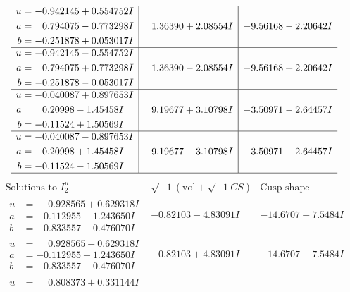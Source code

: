 \documentclass[1p]{elsarticle_modified}
\theoremstyle{definition}
\newcommand{\I}{\sqrt{-1}}
\begin{document}
$$\begin{array}{c|c|c}
\begin{aligned}
u &= -0.942145 + 0.554752 I \\
a &= \phantom{-}0.794075 - 0.773298 I \\
b &= -0.251878 + 0.053017 I\end{aligned}
 & \phantom{-}1.36390 + 2.08554 I & -9.56168 - 2.20642 I \\ \hline\begin{aligned}
u &= -0.942145 - 0.554752 I \\
a &= \phantom{-}0.794075 + 0.773298 I \\
b &= -0.251878 - 0.053017 I\end{aligned}
 & \phantom{-}1.36390 - 2.08554 I & -9.56168 + 2.20642 I \\ \hline\begin{aligned}
u &= -0.040087 + 0.897653 I \\
a &= \phantom{-}0.20998 - 1.45458 I \\
b &= -0.11524 + 1.50569 I\end{aligned}
 & \phantom{-}9.19677 + 3.10798 I & -3.50971 - 2.64457 I \\ \hline\begin{aligned}
u &= -0.040087 - 0.897653 I \\
a &= \phantom{-}0.20998 + 1.45458 I \\
b &= -0.11524 - 1.50569 I\end{aligned}
 & \phantom{-}9.19677 - 3.10798 I & -3.50971 + 2.64457 I\\
 \hline 
 \end{array}$$\newpage$$\begin{array}{c|c|c}  
\text{Solutions to }I^u_{2}& \I (\text{vol} + \sqrt{-1}CS) & \text{Cusp shape}\\
 \hline 
\begin{aligned}
u &= \phantom{-}0.928565 + 0.629318 I \\
a &= -0.112955 + 1.243650 I \\
b &= -0.833557 - 0.476070 I\end{aligned}
 & -0.82103 - 4.83091 I & -14.6707 + 7.5484 I \\ \hline\begin{aligned}
u &= \phantom{-}0.928565 - 0.629318 I \\
a &= -0.112955 - 1.243650 I \\
b &= -0.833557 + 0.476070 I\end{aligned}
 & -0.82103 + 4.83091 I & -14.6707 - 7.5484 I \\ \hline\begin{aligned}
u &= \phantom{-}0.808373 + 0.331144 I \\

\end{aligned}
\end{array}$$
\end{document}
